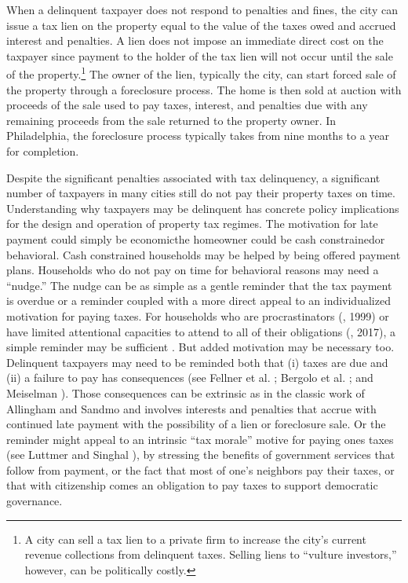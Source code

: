 \documentclass[12pt]{article}
\begin{document}
When a delinquent taxpayer does not respond to penalties and fines,
the city can issue a tax lien on the property equal to the value of the
taxes owed and accrued interest and penalties.  A lien does not
impose an immediate direct cost on the taxpayer since payment to the holder
of the tax lien will not occur until the sale of the property.\footnote{
A city can sell a tax lien to a private firm to increase the city's current
revenue collections from delinquent taxes. Selling liens  to ``vulture investors,'' however,
can be politically costly.} The owner of the lien, typically the city,
can start forced sale of the property through a foreclosure process. The home
is then sold at auction with proceeds of the sale used to pay taxes, interest, and
penalties due with any remaining proceeds from the sale returned to the property owner.
In Philadelphia, the foreclosure process typically takes from nine months to a year for completion.

Despite the significant penalties associated with tax delinquency, a
significant number of taxpayers in many cities still do not pay their property taxes
on time. Understanding why taxpayers may be delinquent has concrete policy implications for the design and operation of property tax regimes.
 The motivation for late payment could simply be economic\textemdash the homeowner could be cash constrained\textemdash or behavioral. Cash constrained households may be
helped by being offered payment plans. Households who do not pay on time for behavioral
reasons may need a ``nudge.'' The nudge can be as simple as a gentle reminder that the
tax payment is overdue or a reminder coupled with a more direct appeal to an individualized
motivation for paying taxes. For households who are procrastinators (\citeauthor{DR-99}, 1999) or have limited attentional capacities to attend to all of their obligations (\citeauthor{gabaix_2017}, 2017), a simple reminder may be sufficient \cite{thaler,karlan2016}. But added motivation may be necessary too.
Delinquent taxpayers may need to be reminded both that (i) taxes are due and (ii) a failure to pay
has consequences (see Fellner et al. \citeyear{Fellner-13}; Bergolo et al. \citeyear{bergolo2017tax}; and Meiselman \citeyear{meiselman2017ghostbusting}). Those consequences can be extrinsic as in the classic work
of Allingham and Sandmo \citeyear{Allingham-Sandmo-72} and involves interests and penalties that accrue
with continued 	late payment with the possibility of a lien or foreclosure sale. Or the reminder might appeal to an intrinsic ``tax morale'' motive for paying ones taxes (see Luttmer and Singhal \citeyear{Luttmer-14}), by stressing the
benefits of government services that follow from payment, or the fact that most of one's neighbors pay their taxes, or
that with citizenship comes an obligation to pay taxes to support democratic governance.
\end{document}
